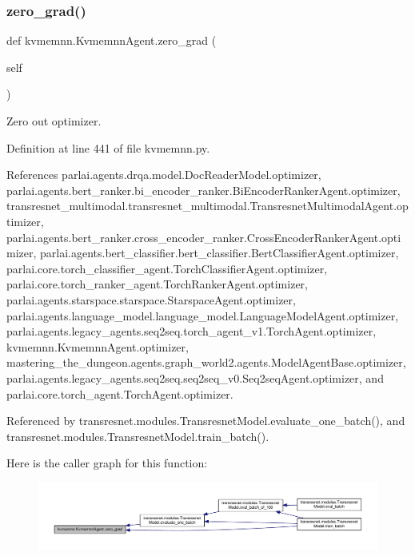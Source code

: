 \subsubsection{\texorpdfstring{zero\+\_\+grad()}{zero\_grad()}}
{\footnotesize\ttfamily def kvmemnn.\+Kvmemnn\+Agent.\+zero\+\_\+grad (\begin{DoxyParamCaption}\item[{}]{self }\end{DoxyParamCaption})}

\begin{DoxyVerb}Zero out optimizer.\end{DoxyVerb}
 

Definition at line 441 of file kvmemnn.\+py.



References parlai.\+agents.\+drqa.\+model.\+Doc\+Reader\+Model.\+optimizer, parlai.\+agents.\+bert\+\_\+ranker.\+bi\+\_\+encoder\+\_\+ranker.\+Bi\+Encoder\+Ranker\+Agent.\+optimizer, transresnet\+\_\+multimodal.\+transresnet\+\_\+multimodal.\+Transresnet\+Multimodal\+Agent.\+optimizer, parlai.\+agents.\+bert\+\_\+ranker.\+cross\+\_\+encoder\+\_\+ranker.\+Cross\+Encoder\+Ranker\+Agent.\+optimizer, parlai.\+agents.\+bert\+\_\+classifier.\+bert\+\_\+classifier.\+Bert\+Classifier\+Agent.\+optimizer, parlai.\+core.\+torch\+\_\+classifier\+\_\+agent.\+Torch\+Classifier\+Agent.\+optimizer, parlai.\+core.\+torch\+\_\+ranker\+\_\+agent.\+Torch\+Ranker\+Agent.\+optimizer, parlai.\+agents.\+starspace.\+starspace.\+Starspace\+Agent.\+optimizer, parlai.\+agents.\+language\+\_\+model.\+language\+\_\+model.\+Language\+Model\+Agent.\+optimizer, parlai.\+agents.\+legacy\+\_\+agents.\+seq2seq.\+torch\+\_\+agent\+\_\+v1.\+Torch\+Agent.\+optimizer, kvmemnn.\+Kvmemnn\+Agent.\+optimizer, mastering\+\_\+the\+\_\+dungeon.\+agents.\+graph\+\_\+world2.\+agents.\+Model\+Agent\+Base.\+optimizer, parlai.\+agents.\+legacy\+\_\+agents.\+seq2seq.\+seq2seq\+\_\+v0.\+Seq2seq\+Agent.\+optimizer, and parlai.\+core.\+torch\+\_\+agent.\+Torch\+Agent.\+optimizer.



Referenced by transresnet.\+modules.\+Transresnet\+Model.\+evaluate\+\_\+one\+\_\+batch(), and transresnet.\+modules.\+Transresnet\+Model.\+train\+\_\+batch().

Here is the caller graph for this function\+:
\nopagebreak
\begin{figure}[H]
\begin{center}
\leavevmode
\includegraphics[width=350pt]{classkvmemnn_1_1KvmemnnAgent_ae907d1e9d3b1ce9708d40b905d4888f5_icgraph}
\end{center}
\end{figure}


